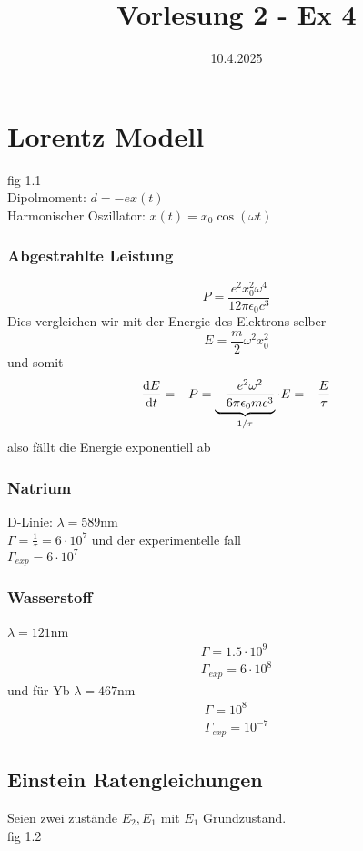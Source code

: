 \documentclass[]{scrbook}
\title{Vorlesung 2 - Ex 4}
\author{}
\date{10.4.2025}
\begin{document}
\maketitle
\newpage
\tableofcontents
\newpage

\section{Lorentz Modell}

fig 1.1\\
Dipolmoment: $d = -ex(t)$\\
Harmonischer Oszillator: $x(t) = x_0 \cos(\omega t)$

\subsubsection{Abgestrahlte Leistung}
$$
P = \frac{e^2 x_0^2 \omega^4}{12\pi\epsilon_0 c^3}
$$
Dies vergleichen wir mit der Energie des Elektrons selber
$$
E = \frac{m}{2}\omega^2 x_0^2
$$
und somit
$$
\frac{\text dE}{\text dt} = -P = \underbrace{-\frac{e^2\omega^2}{6\pi\epsilon_0 mc^3}}_{1/\tau}\cdot E = -\frac{E}{\tau}
$$
also fällt die Energie exponentiell ab

\subsubsection{Natrium}
D-Linie: $\lambda = 589$nm\\
$\Gamma = \frac{1}{\tau} = 6\cdot 10^{7}$ und der experimentelle fall\\
$\Gamma_{exp} = 6\cdot 10^{7}$
\subsubsection{Wasserstoff}
$\lambda = 121$nm
\begin{gather*}
	\Gamma = 1.5\cdot10^{9}\\
	\Gamma_{exp} = 6\cdot10^{8}
\end{gather*}
und für Yb $\lambda = 467$nm
\begin{gather*}
	\Gamma = 10^{8}\\
	\Gamma_{exp} = 10^{-7}
\end{gather*}

\subsection{Einstein Ratengleichungen}

Seien zwei zustände $E_2, E_1$ mit $E_1$ Grundzustand.\\
fig 1.2\\
\end{document}
